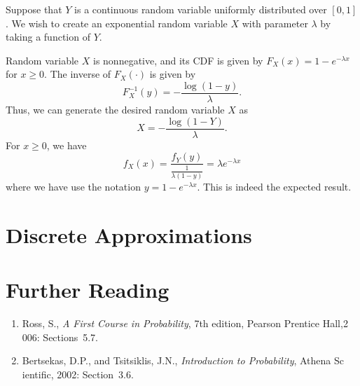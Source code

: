 \begin{example}
Suppose that $Y$ is a continuous random variable uniformly distributed over $[0,1]$.
We wish to create an exponential random variable $X$ with parameter $\lambda$ by taking a function of $Y$.

Random variable $X$ is nonnegative, and its CDF is given by $F_X(x) = 1 - e^{- \lambda x}$ for $x \geq 0$.
The inverse of $F_X (\cdot)$ is given by
\begin{equation*}
F_X^{-1} (y) = - \frac{ \log (1 - y) }{\lambda} .
\end{equation*}
Thus, we can generate the desired random variable $X$ as
\begin{equation*}
X = - \frac{ \log (1 - Y) }{\lambda} .
\end{equation*}
For $x \geq 0$, we have
\begin{equation*}
f_X (x) = \frac{ f_Y (y) }{ \frac{1}{\lambda (1 - y)} }
= \lambda e^{- \lambda x}
\end{equation*}
where we have use the notation $y = 1 - e^{- \lambda x}$.
This is indeed the expected result.
\end{example}


\section{Discrete Approximations}

\section*{Further Reading}

\begin{small}
\begin{enumerate}
\item Ross, S., \emph{A First Course in Probability}, 7th edition, Pearson Prentice Hall,2
006: Sections~5.7.
\item Bertsekas, D.P., and Tsitsiklis, J.N., \emph{Introduction to Probability}, Athena Sc
ientific, 2002: Section~3.6.
\end{enumerate}
\end{small}

